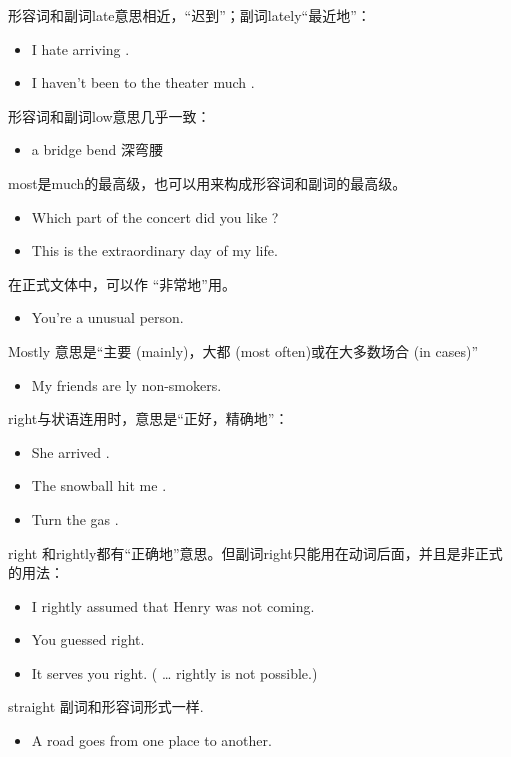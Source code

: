 形容词和副词late意思相近，“迟到”；副词lately“最近地”：
\begin{itemize}
\item I hate arriving .

\item I haven't been to the theater much .
\end{itemize}

形容词和副词low意思几乎一致：
\begin{itemize}
\item a  bridge \qquad bend  深弯腰
\end{itemize}

most是much的最高级，也可以用来构成形容词和副词的最高级。
\begin{itemize}
\item Which part of the concert did you like ?
\item This is the  extraordinary day of my life.
\end{itemize}
在正式文体中，可以作
“非常地”用。
\begin{itemize}
\item You're a  unusual person.
\end{itemize}
Mostly 意思是“主要 (mainly)，大都 (most often)或在大多数场合 (in  cases)”
\begin{itemize}
\item My friends are ly non-smokers.
\end{itemize}


right与状语连用时，意思是“正好，精确地”：
\begin{itemize}
\item She arrived  .
\item The snowball hit me  .
\item Turn the gas  .
\end{itemize}
right 和rightly都有“正确地”意思。但副词right只能用在动词后面，并且是非正式
的用法：
\begin{itemize}
\item I rightly assumed that Henry was not coming.
\item You guessed right.
\item It serves you right. ( … rightly is not possible.)
\end{itemize}

straight 副词和形容词形式一样.
\begin{itemize}
\item A  road goes  from one place to another.
\end{itemize}

